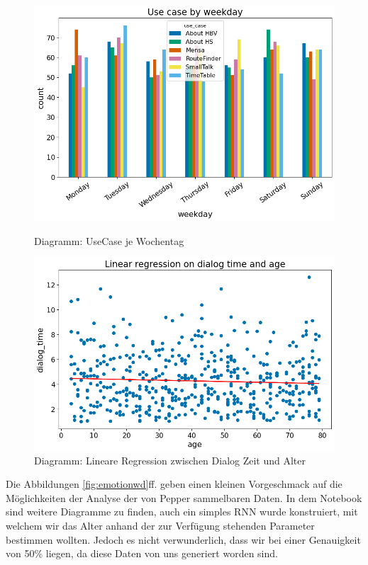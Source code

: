 \begin{figure}[H]
    \centering
    \begin{minipage}[b]{0.49\textwidth}
        \includegraphics[width=\textwidth]{Figures/analysis/usecasewd.png}
        \caption{Diagramm: UseCase je Wochentag}
        \label{fig:usecasewd}
    \end{minipage}
    \hfill
    \begin{minipage}[b]{0.49\textwidth}
        \includegraphics[width=\textwidth]{Figures/analysis/linreg.png}
        \caption{Diagramm: Lineare Regression zwischen Dialog Zeit und Alter}
        \label{fig:linreg}
    \end{minipage}
\end{figure}

Die Abbildungen \ref{fig:emotionwd}ff. geben einen kleinen Vorgeschmack auf die Möglichkeiten der Analyse der von Pepper sammelbaren Daten. In dem Notebook sind weitere Diagramme zu finden, auch ein simples RNN wurde konstruiert, mit welchem wir das Alter anhand der zur Verfügung stehenden Parameter bestimmen wollten. Jedoch es nicht verwunderlich, dass wir bei einer Genauigkeit von 50\% liegen, da diese Daten von uns generiert worden sind.

